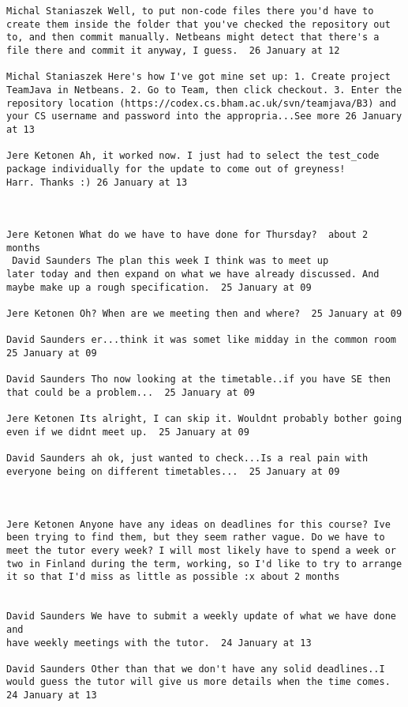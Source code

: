 \documentclass[10pt]{report}
\begin{document}
\begin{verbatim}
Michal Staniaszek Well, to put non-code files there you'd have to
create them inside the folder that you've checked the repository out
to, and then commit manually. Netbeans might detect that there's a
file there and commit it anyway, I guess.  26 January at 12

Michal Staniaszek Here's how I've got mine set up: 1. Create project
TeamJava in Netbeans. 2. Go to Team, then click checkout. 3. Enter the
repository location (https://codex.cs.bham.ac.uk/svn/teamjava/B3) and
your CS username and password into the appropria...See more 26 January
at 13

Jere Ketonen Ah, it worked now. I just had to select the test_code
package individually for the update to come out of greyness!
Harr. Thanks :) 26 January at 13



Jere Ketonen What do we have to have done for Thursday?  about 2
months 
 David Saunders The plan this week I think was to meet up
later today and then expand on what we have already discussed. And
maybe make up a rough specification.  25 January at 09

Jere Ketonen Oh? When are we meeting then and where?  25 January at 09

David Saunders er...think it was somet like midday in the common room
25 January at 09

David Saunders Tho now looking at the timetable..if you have SE then
that could be a problem...  25 January at 09

Jere Ketonen Its alright, I can skip it. Wouldnt probably bother going
even if we didnt meet up.  25 January at 09

David Saunders ah ok, just wanted to check...Is a real pain with
everyone being on different timetables...  25 January at 09



Jere Ketonen Anyone have any ideas on deadlines for this course? Ive
been trying to find them, but they seem rather vague. Do we have to
meet the tutor every week? I will most likely have to spend a week or
two in Finland during the term, working, so I'd like to try to arrange
it so that I'd miss as little as possible :x about 2 months 
 

David Saunders We have to submit a weekly update of what we have done and
have weekly meetings with the tutor.  24 January at 13

David Saunders Other than that we don't have any solid deadlines..I
would guess the tutor will give us more details when the time comes.
24 January at 13


\end{verbatim}
\end{document}
